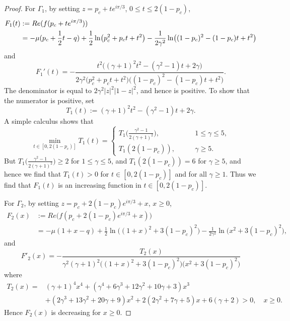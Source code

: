 \documentclass[11pt]{article}
\begin{document}
\begin{proof}
For $\Gamma_1$, by setting $z=p_c+te^{i\pi/3}$, $0\le t\le
2(1-p_c)$,
\begin{equation}
\begin{split}
  F_1(t) &:= Re(f(p_c+te^{i\pi/3})) \\
  & = -\mu (p_c+\frac12 t -q)
+ \frac12 \ln\bigl(p_c^2+p_ct+t^2\bigr)
  - \frac1{2\gamma^2} \ln\bigl((1-p_c)^2-(1-p_c)t+t^2\bigr)
\end{split}
\end{equation}
and
\begin{equation}
  F_1'(t) = -\frac{t^2\bigl( (\gamma+1)^2t^2-(\gamma^2-1)t+2\gamma \bigr)}
  {2\gamma^2\bigl(p_c^2+p_ct+t^2\bigr)
  \bigl((1-p_c)^2-(1-p_c)t+t^2\bigr)}.
\end{equation}
The denominator is equal to $2\gamma^2|z|^2|1-z|^2$, and hence is
positive. To show that the numerator is positive, set
\begin{equation}
  T_1(t):= (\gamma+1)^2t^2-(\gamma^2-1)t+2\gamma.
\end{equation}
A simple calculus shows that
\begin{equation}
  \min_{ t\in [0, 2(1-p_c)]} T_1(t)= \begin{cases}
    T_1\bigl(\frac{\gamma^2-1}{2(\gamma+1)^2}\bigr), \qquad &1\le \gamma \le
    5, \\
    T_1(2(1-p_c)), \qquad &\gamma \ge 5.
  \end{cases}
\end{equation}
But $T_1\bigl(\frac{\gamma^2-1}{2(\gamma+1)^2}\bigr) \ge 2$
for $1\le \gamma\le 5$, and $T_1(2(1-p_c))=6$ for $\gamma\ge 5$,
and hence we find that $T_1(t)>0$ for $t\in[0, 2(1-p_c)]$ and for
all $\gamma\ge 1$. Thus we find that $F_1(t)$ is an increasing
function in $t\in [0, 2(1-p_c)]$.

For $\Gamma_2$, by setting $z= p_c+2(1-p_c)e^{i\pi/3} + x$, $x\ge
0$,
\begin{equation}
\begin{split}
  F_2(x) &:= Re\bigl(f (p_c+2(1-p_c)e^{i\pi/3} + x)\bigr) \\
  &= -\mu(1+x-q) + \frac12 \ln \bigl( (1+x)^2+3(1-p_c)^2\bigr)
  - \frac1{2\gamma^2} \ln\bigl( x^2+3(1-p_c)^2\bigr),
\end{split}
\end{equation}
and
\begin{equation}
  F'_2(x) = -\frac{T_2(x)}{\gamma^2(\gamma+1)^2 \bigl( (1+x)^2+3(1-p_c)^2\bigr)
  \bigl( x^2+3(1-p_c)^2\bigr)}
\end{equation}
where
\begin{equation}
\begin{split}
  T_2(x) =& (\gamma+1)^4x^4 +
  (\gamma^4+6\gamma^3+12\gamma^2+10\gamma+3)x^3 \\
  & + (2\gamma^3+13\gamma^2+20\gamma+9)x^2
  + 2(2\gamma^2+7\gamma+5)x + 6(\gamma+2)>0, \quad x\ge 0.
\end{split}
\end{equation}
Hence $F_2(x)$ is decreasing for $x\ge 0$.


\end{proof}
\end{document}
